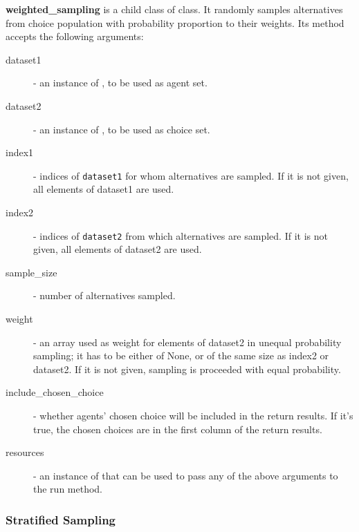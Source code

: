 {\bf weighted_sampling} is a child class of  class.
It randomly samples alternatives from choice population with
probability proportion to their weights. Its  method accepts the
following arguments:
\begin{description}
\item[dataset1] - an instance of , to be used as agent set.
\item[dataset2] - an instance of , to be used as choice set.
\item[index1] - indices of \verb|dataset1| for whom alternatives are sampled.
If it is not given, all elements of dataset1 are used.
\item[index2] - indices of \verb|dataset2| from which alternatives are
sampled. If it is not given, all elements of dataset2 are used.
\item[sample_size] - number of alternatives sampled.
\item[weight] - an array used as weight for elements of dataset2 in unequal
probability sampling; it has to be either of None, or of the same size as index2 or
dataset2. If it is not given, sampling is proceeded with equal probability.
\item[include_chosen_choice] - whether agents' chosen choice will be included in
the return results. If it's true, the chosen choices are in the first column of
the return results.
\item[resources] - an instance of  that can be used to pass any of
the above arguments to the run method.
\end{description}

\subsubsection{Stratified Sampling}

